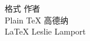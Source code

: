 \begin{tabbing}
格式\hspace{3em} \= 作者 \\
Plain \TeX  \> 高德纳 \\
\LaTeX      \> Leslie Lamport
\end{tabbing}
